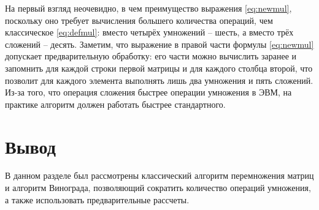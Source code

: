 На первый взгляд неочевидно, в чем преимущество выражения \ref{eq:newmul}, поскольку оно требует вычисления большего 
количества операций, чем классическое \ref{eq:defmul}:
вместо четырёх умножений -- шесть, а вместо трёх сложений -- десять. Заметим, что выражение в правой части формулы \ref{eq:newmul}
допускает предварительную обработку: его части можно вычислить заранее и запомнить для каждой строки первой матрицы
и для каждого столбца второй, что позволит для каждого элемента выполнять лишь два умножения и пять сложений.
Из-за того, что операция сложения быстрее операции умножения в ЭВМ, на практике алгоритм должен работать быстрее стандартного.


\section{Вывод}

В данном разделе был рассмотрены классический алгоритм перемножения матриц и алгоритм Винограда, позволяющий сократить количество операций умножения, 
а также использовать предварительные рассчеты.